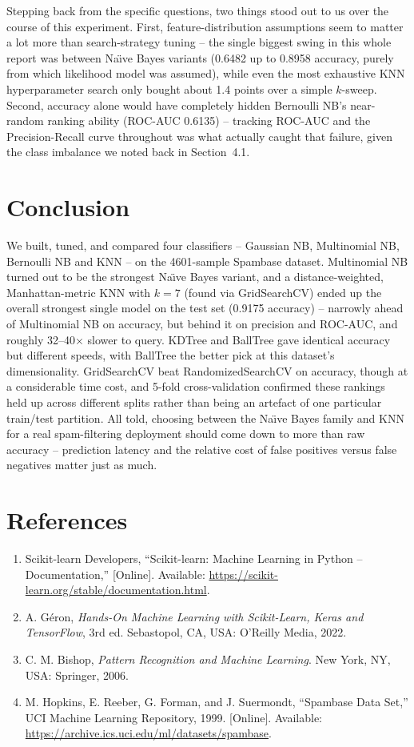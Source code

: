 \documentclass[12pt,a4paper]{article}
\begin{document}
Stepping back from the specific questions, two things stood out to us over the course of this experiment. First, feature-distribution assumptions seem to matter a lot more than search-strategy tuning -- the single biggest swing in this whole report was between Na\"{\i}ve Bayes variants (0.6482 up to 0.8958 accuracy, purely from which likelihood model was assumed), while even the most exhaustive KNN hyperparameter search only bought about 1.4 points over a simple $k$-sweep. Second, accuracy alone would have completely hidden Bernoulli NB's near-random ranking ability (ROC-AUC 0.6135) -- tracking ROC-AUC and the Precision-Recall curve throughout was what actually caught that failure, given the class imbalance we noted back in Section~4.1.
 
\section{Conclusion}
We built, tuned, and compared four classifiers -- Gaussian NB, Multinomial NB, Bernoulli NB and KNN -- on the 4601-sample Spambase dataset. Multinomial NB turned out to be the strongest Na\"{\i}ve Bayes variant, and a distance-weighted, Manhattan-metric KNN with $k=7$ (found via GridSearchCV) ended up the overall strongest single model on the test set (0.9175 accuracy) -- narrowly ahead of Multinomial NB on accuracy, but behind it on precision and ROC-AUC, and roughly 32--40$\times$ slower to query. KDTree and BallTree gave identical accuracy but different speeds, with BallTree the better pick at this dataset's dimensionality. GridSearchCV beat RandomizedSearchCV on accuracy, though at a considerable time cost, and 5-fold cross-validation confirmed these rankings held up across different splits rather than being an artefact of one particular train/test partition. All told, choosing between the Na\"{\i}ve Bayes family and KNN for a real spam-filtering deployment should come down to more than raw accuracy -- prediction latency and the relative cost of false positives versus false negatives matter just as much.
 
\section{References}
\begin{enumerate}[leftmargin=*]
\item Scikit-learn Developers, ``Scikit-learn: Machine Learning in Python -- Documentation,'' [Online]. Available: \url{https://scikit-learn.org/stable/documentation.html}.
\item A. G\'eron, \textit{Hands-On Machine Learning with Scikit-Learn, Keras and TensorFlow}, 3rd ed. Sebastopol, CA, USA: O'Reilly Media, 2022.
\item C. M. Bishop, \textit{Pattern Recognition and Machine Learning}. New York, NY, USA: Springer, 2006.
\item M. Hopkins, E. Reeber, G. Forman, and J. Suermondt, ``Spambase Data Set,'' UCI Machine Learning Repository, 1999. [Online]. Available: \url{https://archive.ics.uci.edu/ml/datasets/spambase}.
\end{enumerate}
 
\end{document}

